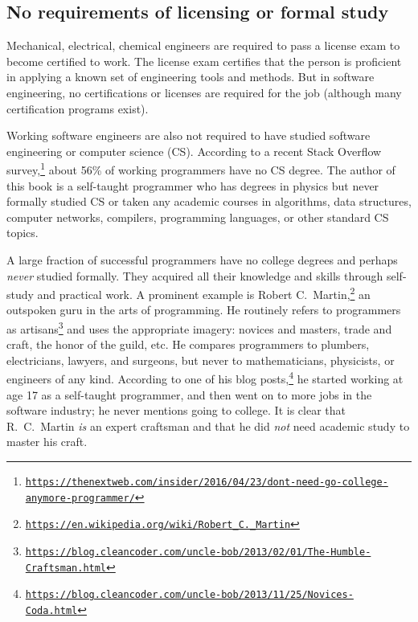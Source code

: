 \subsection{No requirements of licensing or formal study}

Mechanical, electrical, chemical engineers are required to pass a
license exam to become certified to work. The license exam certifies
that the person is proficient in applying a known set of engineering
tools and methods. But in software engineering, no certifications
or licenses are required for the job (although many certification
programs exist).

Working software engineers are also not required to have studied software
engineering or computer science (CS). According to a recent Stack
Overflow survey,\footnote{\texttt{\href{https://thenextweb.com/insider/2016/04/23/dont-need-go-college-anymore-programmer/}{https://thenextweb.com/insider/2016/04/23/dont-need-go-college-anymore-programmer/}}}
about 56\% of working programmers have no CS degree. The author of
this book is a self-taught programmer who has degrees in physics but
never formally studied CS or taken any academic courses in algorithms,
data structures, computer networks, compilers, programming languages,
or other standard CS topics. 

A large fraction of successful programmers have no college degrees
and perhaps \emph{never} studied formally. They acquired all their
knowledge and skills through self-study and practical work. A prominent
example is Robert C.~Martin,\footnote{\texttt{\href{https://en.wikipedia.org/wiki/Robert_C._Martin}{https://en.wikipedia.org/wiki/Robert\_C.\_Martin}}}
an outspoken guru in the arts of programming. He routinely refers
to programmers as artisans\footnote{\texttt{\href{https://blog.cleancoder.com/uncle-bob/2013/02/01/The-Humble-Craftsman.html}{https://blog.cleancoder.com/uncle-bob/2013/02/01/The-Humble-Craftsman.html}}}
and uses the appropriate imagery: novices and masters, trade and craft,
the honor of the guild, etc. He compares programmers to plumbers,
electricians, lawyers, and surgeons, but never to mathematicians,
physicists, or engineers of any kind. According to one of his blog
posts,\footnote{\texttt{\href{https://blog.cleancoder.com/uncle-bob/2013/11/25/Novices-Coda.html}{https://blog.cleancoder.com/uncle-bob/2013/11/25/Novices-Coda.html}}}
he started working at age 17 as a self-taught programmer, and then
went on to more jobs in the software industry; he never mentions going
to college. It is clear that R.~C.~Martin \emph{is} an expert craftsman
and that he did \emph{not} need academic study to master his craft.

